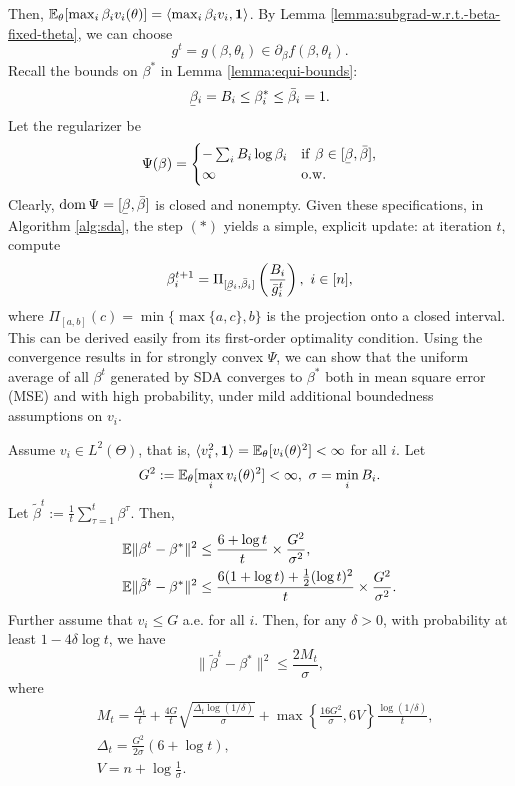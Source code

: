 Then, $\mathbb{E}_\theta[ \max_i\beta_i v_i(
\theta)] = \langle \max_i \beta_i v_i, \mathbf{1}\rangle$. By Lemma \ref{lemma:subgrad-w.r.t.-beta-fixed-theta}, we can choose \[g^t = g(\beta, \theta_t) \in \partial_\beta f(\beta, \theta_t).\]
Recall the bounds on $\beta^*$ in Lemma \ref{lemma:equi-bounds}: 
\[ \ubar{\beta}_i = B_i \leq \beta^*_i \leq \bar{\beta}_i = 1. \] 
Let the regularizer be
\[ \Psi(\beta) = \begin{cases}
	-\sum_i B_i \log \beta_i & {\rm if}\ \beta\in [\ubar{\beta}, \bar{\beta}], \\
	\infty & {\rm o.w.}
\end{cases} \]
Clearly, ${\rm dom}\, \Psi = [\ubar{\beta}, \bar{\beta}]$ is closed and nonempty. 
Given these specifications, in Algorithm \ref{alg:sda}, the step $(*)$ yields a simple, explicit update: at iteration $t$, compute 
\[\beta^{t+1}_i = 
\Pi_{[\ubar{\beta}_i, \bar{\beta}_i]}  \left( \frac{B_i}{\bar{g}^t_i} \right),\ i\in [n], \] 
where $\Pi_{[a,b]}(c) = \min\{ \max\{a, c \}, b  \}$ is the projection onto a closed interval. 
This can be derived easily from its first-order optimality condition.
Using the convergence results in \citep{xiao2010dual} for strongly convex $\Psi$, we can show that the uniform average of all $\beta^t$ generated by SDA converges to $\beta^*$ both in mean square error (MSE) and with high probability, under mild additional boundedness assumptions on $v_i$.
\begin{theorem}
	Assume $v_i \in L^2(\Theta)$, that is, $\langle v_i^2, \mathbf{1}\rangle = \mathbb{E}_\theta[v_i(\theta)^2 ] < \infty$ for all $i$. 
	Let 
	\[ G^2 := \mathbb{E}_\theta [\max_i v_i(\theta)^2]  < \infty, \ \sigma = \min_i B_i.\] 
	Let $\tilde{\beta}^t := \frac{1}{t} \sum_{\tau = 1}^t \beta^\tau$. 
	Then,
	\begin{align*}
		& \mathbb{E} \| \beta^t - \beta^* \|^2 \leq \frac{6 + \log t}{t} \times \frac{G^2}{\sigma^2} , \\
		& \mathbb{E} \|\tilde{\beta}^t - \beta^* \|^2 \leq \frac{6(1+\log t) + \frac{1}{2}(\log t)^2}{t} \times \frac{G^2}{\sigma^2}.
	\end{align*}
	Further assume that $v_i \leq G$ a.e. for all $i$. 
	Then, for any $\delta>0$, with probability at least $ 1 - 4\delta \log t$, we have \[\|\tilde{\beta}^t - \beta^*\|^2 \leq \frac{2M_t}{\sigma},\]
	where
	\begin{align*}
		& M_t = \frac{\Delta_t}{t} + \frac{4 G}{t}\sqrt{\frac{\Delta_t \log (1/\delta)}{\sigma}} + \max \left\{ \frac{16 G^2}{\sigma}, 6V \right\}\frac{\log (1/\delta)}{t}, \\
		& \Delta_t = \frac{G^2}{2\sigma} (6 + \log t), \\
		& V = n + \log \frac{1}{\sigma}.
	\end{align*}
	\label{thm:sda-conv}
\end{theorem}
